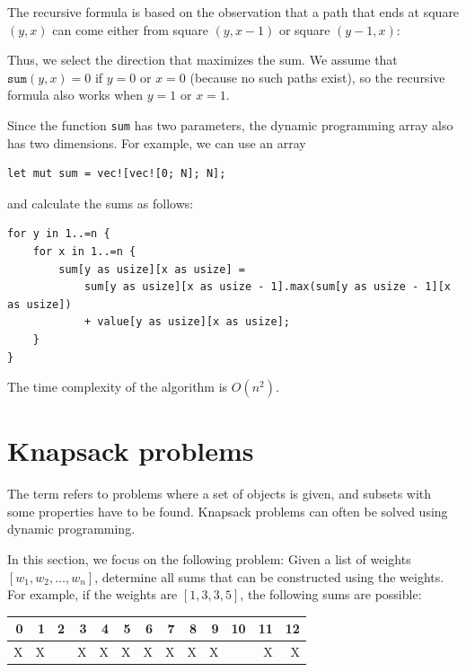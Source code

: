 The recursive formula is based on the observation
that a path that ends at square $(y,x)$
can come either from square $(y,x-1)$
or square $(y-1,x)$:
\begin{center}
\end{center}

Thus, we select the direction that maximizes
the sum.
We assume that $\texttt{sum}(y,x)=0$
if $y=0$ or $x=0$ (because no such paths exist),
so the recursive formula also works when $y=1$ or $x=1$.

Since the function \texttt{sum} has two parameters,
the dynamic programming array also has two dimensions.
For example, we can use an array
\begin{lstlisting}
let mut sum = vec![vec![0; N]; N];
\end{lstlisting}
and calculate the sums as follows:
\begin{lstlisting}
for y in 1..=n {
    for x in 1..=n {
        sum[y as usize][x as usize] =
            sum[y as usize][x as usize - 1].max(sum[y as usize - 1][x as usize])
            + value[y as usize][x as usize];
    }
}
\end{lstlisting}
The time complexity of the algorithm is $O(n^2)$.

\section{Knapsack problems}


The term  refers to problems where
a set of objects is given, and 
subsets with some properties
have to be found.
Knapsack problems can often be solved
using dynamic programming.

In this section, we focus on the following
problem: Given a list of weights
$[w_1,w_2,\ldots,w_n]$,
determine all
sums that can be constructed using the weights.
For example, if the weights are
$[1,3,3,5]$, the following sums are possible:

\begin{center}
\begin{tabular}{rrrrrrrrrrrrr}
 0 & 1 & 2 & 3 & 4 & 5 & 6 & 7 & 8 & 9 & 10 & 11 & 12 \\
\hline
 X & X & & X & X & X & X & X & X & X & & X & X \\
\end{tabular}
\end{center}

